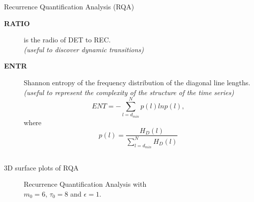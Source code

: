 {{{\begin{frame}{Recurrence Quantification Analysis (RQA)}
\begin{description}
\item [ \textbf{RATIO} ] is the radio of DET to REC. \\
			\textit{(useful to discover dynamic transitions)}
\item [ \textbf{ENTR} ] Shannon entropy of the frequency distribution of the 
			diagonal line lengths.
			\textit{(useful to represent the complexity of the 
				structure of the time series)}
\begin{equation*}
	ENT= - \sum^{N}_{l=d_{min}} p(l) ln p(l),
\end{equation*}
where 
\begin{equation*}
	p(l)=\frac{ H_D(l) }{ \sum^{N}_{ l=d_{min} } H_D(l) }
\end{equation*}

\end{description}


	
\end{frame}
}



\subsection{}
{

\begin{frame}{3D surface plots of RQA}

    \begin{figure}
	\caption{Recurrence Quantification Analysis with \\
		$m_0=6$, $\tau_0=8$ and $\epsilon=1$.
		} 
   \end{figure}
		
\end{frame}
}





\subsection{}
{

}}}

